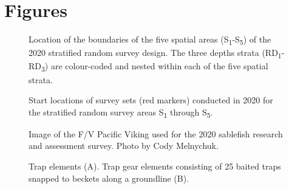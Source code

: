 \documentclass[12pt]{article}\usepackage[]{graphicx}\usepackage[]{color}
\begin{document}
\hypertarget{figures}{%
\section{Figures}\label{figures}}


\begin{figure}[htb]

{\centering {} 

}

\caption{Location of the boundaries of the five spatial areas (S\textsubscript{1}-S\textsubscript{5}) of the 2020 stratified random survey design. The three depths strata (RD\textsubscript{1}-RD\textsubscript{3}) are colour-coded and nested within each of the five spatial strata.}\label{fig:figure1}
\end{figure}
\clearpage


\begin{figure}[htb]

{\centering {} 

}

\caption{Start locations of survey sets (red markers) conducted in 2020 for the stratified random survey areas S\textsubscript{1} through S\textsubscript{5}.}\label{fig:figure2}
\end{figure}
\clearpage


\begin{figure}[htb]

{\centering {} 

}

\caption{Image of the F/V Pacific Viking used for the 2020 sablefish research and assessment survey. Photo by Cody Melnychuk.}\label{fig:figure3}
\end{figure}
\clearpage


\begin{figure}[htb]

{\centering {} 

}

\caption{Trap elements (A). Trap gear elements consisting of 25 baited traps snapped to beckets along a groundline (B).}\label{fig:figure4}
\end{figure}
\clearpage
\end{document}
